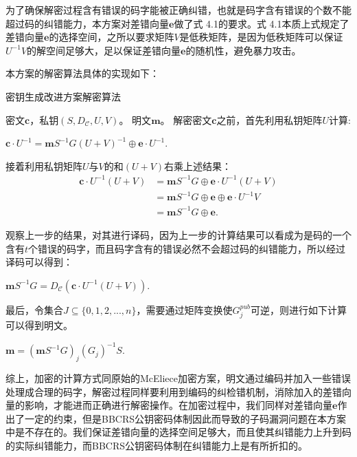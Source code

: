 为了确保解密过程含有错误的码字能被正确纠错，也就是码字含有错误的个数不能超过码的纠错能力，本方案对差错向量$\mathbf{e}$做了式 4.1的要求。式 4.1本质上式规定了差错向量$\mathbf{e}$的选择空间，之所以要求矩阵$V$是低秩矩阵，是因为低秩矩阵可以保证$U^{-1}V$的解空间足够大，足以保证差错向量$\mathbf{e}$的随机性，避免暴力攻击。

本方案的解密算法具体的实现如下：

\begin{breakablealgorithm}
	\small
	\renewcommand{\algorithmicrequire}{\textbf{Input:}}
	\renewcommand{\algorithmicensure}{\textbf{Output:}}
	\caption{密钥生成改进方案解密算法}
	\label{alg:NewDe}
	\begin{algorithmic}[1]
		\Require
		密文$\mathbf{c}$，私钥$(S,D_\mathcal{C},U,V)$。
		\Ensure
		明文$\mathbf{m}$。
		\State
		解密密文$\mathbf{c}$之前，首先利用私钥矩阵$U$计算:
		\begin{center}
			$\textbf{c}\cdot U^{-1} = \textbf{m}S^{-1}G(U+V)^{-1} \oplus\textbf{e}\cdot U^{-1}.$
		\end{center}
		\State
		接着利用私钥矩阵$U$与$V$的和$(U + V)$右乘上述结果：
		\begin{equation}
			\begin{aligned}
				\textbf{c}\cdot U^{-1}(U+V) &= \textbf{m}S^{-1}G \oplus\textbf{e}\cdot U^{-1}(U+V) \\
				& = \textbf{m}S^{-1}G \oplus  \textbf{e} \oplus \textbf{e}\cdot U^{-1}V \\
				& = \textbf{m}S^{-1}G \oplus  \textbf{e}.
			\end{aligned}
		\end{equation}
		
		\State
		观察上一步的结果，对其进行译码，因为上一步的计算结果可以看成为是码的一个含有$t$个错误的码字，而且码字含有的错误必然不会超过码的纠错能力，所以经过译码可以得到：
		\begin{center}
			$\mathbf{m}S^{-1}G = D_\mathcal{C}(\textbf{c}\cdot U^{-1}(U+V)).$
		\end{center}
		
		\State
		最后，令集合$J \subseteq \{0,1,2,...,n\}$，需要通过矩阵变换使$G_j^{pub}$可逆，则进行如下计算可以得到明文。
		\begin{center}
			$\mathbf{m} = (\mathbf{m}S^{-1}G)_j(G_j)^{-1}S.$
		\end{center}		
	\end{algorithmic}
\end{breakablealgorithm}

综上，加密的计算方式同原始的McEliece加密方案，明文通过编码并加入一些错误处理成合理的码字，解密过程同样要利用到编码的纠检错机制，消除加入的差错向量的影响，才能进而正确进行解密操作。在加密过程中，我们同样对差错向量$\mathbf{e}$作出了一定的约束，但是BBCRS公钥密码体制因此而导致的子码漏洞问题在本方案中是不存在的。我们保证差错向量的选择空间足够大，而且使其纠错能力上升到码的实际纠错能力，而BBCRS公钥密码体制在纠错能力上是有所折扣的。

